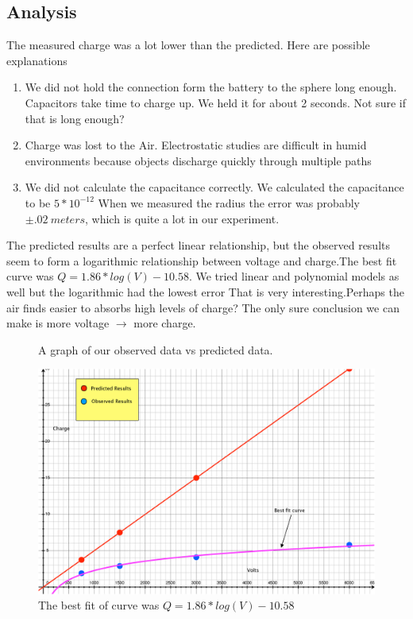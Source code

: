 \documentclass[12pt]{article}
\begin{document}
\subsection*{Analysis}
The measured charge was a lot lower than the predicted. Here are possible explanations
\begin{enumerate}
	\item 
	We did not hold the connection form the battery to the sphere long enough. Capacitors take time to charge up. We held it for about 2 seconds. Not sure if that is long enough?
	\item Charge was lost to the Air. Electrostatic studies are difficult in humid environments because objects discharge quickly through multiple paths 
	\item We did not calculate the capacitance correctly. We calculated the capacitance to be $5 * 10^{-12}$ When we measured the radius the error was probably $\pm .02 \ meters$, which is quite a lot in our experiment.
\end{enumerate}
The predicted results are a perfect linear relationship, but the observed results seem to form a logarithmic relationship between voltage and charge.The best fit curve was $Q=1.86*log(V)-10.58$. We tried linear and polynomial models as well but the logarithmic had the lowest error That is very interesting.Perhaps the air finds easier to absorbs high levels of charge? The only sure conclusion we can make is more voltage $\rightarrow$ more charge.
\begin{figure}[h]
	 \centering
	 \caption*{A graph of our observed data vs predicted data.}
	 \includegraphics[scale = .4]{ResultsGraph}
	 \captionsetup{labelformat=empty}
	{\caption*{The best fit of curve was $Q=1.86*log(V)-10.58$ }}
\end{figure}
\end{document}
